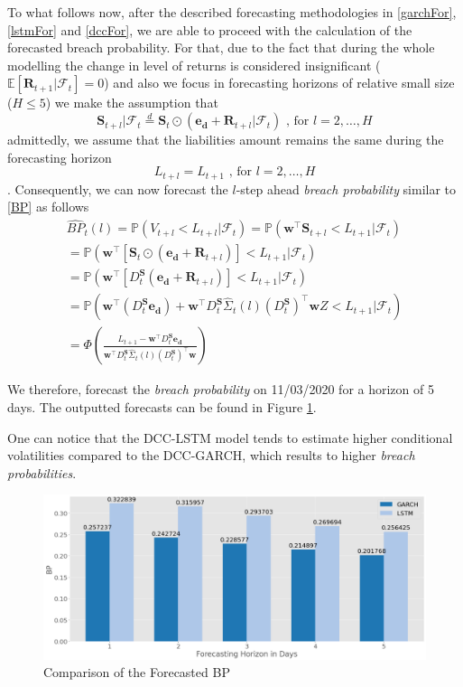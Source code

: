 \documentclass[a4paper, oneside]{discothesis}
\begin{document}
\bigskip\bigskip
To what follows now, after the described forecasting methodologies in \ref{garchFor}, \ref{lstmFor} and \ref{dccFor}, we are able to proceed with the calculation of the forecasted breach probability. For that, due to the fact that during the whole modelling the change in level of returns is considered insignificant ($\mathbb{E}[\mathbf{R}_{t+1}|\mathcal{F}_t]=0$) and also we focus in forecasting horizons of relative small size ($H\leq 5$) we make the assumption that
\[\mathbf{S}_{t+l}|\mathcal{F}_t \overset{d}{=}\mathbf{S}_t\odot\left(\mathbf{e_d}+\mathbf{R}_{t+l}|\mathcal{F}_t\right) \text{ , for } l=2,\dots, H\]
admittedly, we assume that the liabilities amount remains the same during the forecasting horizon
\[L_{t+l} = L_{t+1}\text{ , for } l=2,\dots, H\]. Consequently, we can now forecast the $l$-step ahead \textit{breach probability} similar to \ref{BP} as follows
\begin{equation}
    \begin{split}
        \widehat{BP}_t(l) = \mathbb{P}(V_{t+l}< L_{t+l}|\mathcal{F}_t) = \mathbb{P}\left(\mathbf{w}^\intercal\mathbf{S}_{t+l}< L_{t+1}|\mathcal{F}_t\right) \\
        = \mathbb{P}(\mathbf{w}^\intercal[\mathbf{S}_t\odot(\mathbf{e_d}+\mathbf{R}_{t+l})]< L_{t+1}|\mathcal{F}_t)\\
        = \mathbb{P}\left(\mathbf{w}^\intercal \left[ D_t^\mathbf{S}(\mathbf{e_d}+\mathbf{R}_{t+l})\right]<L_{t+1}|\mathcal{F}_t\right)\\
        =\mathbb{P}\left(\mathbf{w}^\intercal\left( D^\mathbf{S}_t\mathbf{e_d}\right)+\mathbf{w}^\intercal D^\mathbf{S}_t\hat{\Sigma}_{t}(l) (D^\mathbf{S}_t)^\intercal \mathbf{w} Z<L_{t+1}| \mathcal{F}_t\right)\\
=\Phi\left(\frac{L_{t+1}-\mathbf{w}^\intercal D^\mathbf{S}_t\mathbf{e_d}}{\mathbf{w}^\intercal D^\mathbf{S}_t\hat{\Sigma}_{t}(l) (D^\mathbf{S}_t)^\intercal \mathbf{w}}\right)
    \end{split}
\end{equation}

We therefore, forecast the \textit{breach probability} on 11/03/2020 for a horizon of 5 days. The outputted forecasts can be found in Figure \ref{fig:fbp}.

One can notice that the DCC-LSTM model tends to estimate higher conditional volatilities compared to the DCC-GARCH, which results to higher \textit{breach probabilities}.

\begin{figure}[H]
    \centering
    \includegraphics[width = 12cm]{figures/fbp.png}
    \caption{Comparison of the Forecasted BP}
    \label{fig:fbp}
\end{figure}
\end{document}
